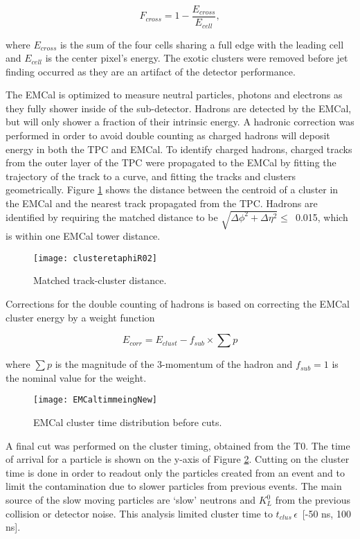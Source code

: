 \begin{equation}
F_{cross} = 1 - \frac{ E_{cross} }{ E_{cell} },
\label{eq:Fcross}
\end{equation}

\noindent
where $E_{cross}$ is the sum of the four cells sharing a full edge with the leading cell and $E_{cell}$ is the center pixel's energy.  The exotic clusters were removed before jet finding occurred as they are an artifact of the detector performance.

The EMCal is optimized to measure neutral particles, photons and electrons as they fully shower inside of the sub-detector.  Hadrons are detected by the EMCal, but will only shower a fraction of their intrinsic energy.  A hadronic correction was performed in order to avoid double counting as charged hadrons will deposit energy in both the TPC and EMCal.  To identify charged hadrons, charged tracks from the outer layer of the TPC were propagated to the EMCal by fitting the trajectory of the track to a curve, and fitting the tracks and clusters geometrically.  Figure \ref{fig:EMChadetaphi} shows the distance between the centroid of a cluster in the EMCal and the nearest track propagated from the TPC.  Hadrons are identified by requiring the matched distance to be $\sqrt{ \Delta\phi^{2} + \Delta\eta^{2} } \leq \,$ 0.015, which is within one EMCal tower distance.

\begin{figure}[b!]
\texttt{[image: clusteretaphiR02]}
\centering
\caption{Matched track-cluster distance.}
\label{fig:EMChadetaphi}
\end{figure}


Corrections for the double counting of hadrons is based on correcting the EMCal cluster energy by a weight function

\begin{equation}
E_{corr} = E_{clust} - f_{sub} \times \sum p
\label{eq:HadCorr}
\end{equation}

\noindent
where $\sum p$ is the magnitude of the 3-momentum of the hadron and $f_{sub} = 1$ is the nominal value for the weight.

\begin{figure}[b!]
\texttt{[image: EMCaltimmeingNew]}
\centering
\caption{EMCal cluster time distribution before cuts.}
\label{fig:EMCaltime}
\end{figure}

A final cut was performed on the cluster timing, obtained from the T0.  The time of arrival for a particle is shown on the y-axis of Figure \ref{fig:EMCaltime}.  Cutting on the cluster time is done in order to readout only the particles created from an event and to limit the contamination due to slower particles from previous events.  The main source of the slow moving particles are `slow' neutrons and $K_{L}^{0}$ from the previous collision or detector noise.  This analysis limited cluster time to $t_{clus} \, \epsilon \,$ [-50 ns, 100 ns].

